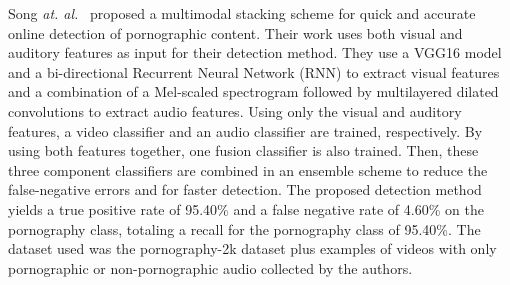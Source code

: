 Song \textit{at. al.}~\cite{song2020enhanced} proposed a multimodal stacking scheme for quick and accurate online detection of pornographic content.
Their work uses both visual and auditory features as input for their detection method. 
They use a VGG16 model and a bi-directional Recurrent Neural Network (RNN) to extract visual features and a combination of a Mel-scaled spectrogram followed by multilayered dilated convolutions to extract audio features. 
Using only the visual and auditory features, a video classifier and an audio classifier are trained, respectively. 
By using both features together, one fusion classifier is also trained.
Then, these three component classifiers are combined in an ensemble scheme to reduce the false-negative errors and for faster detection. 
The proposed detection method yields a true positive rate of 95.40\% and a false negative rate of 4.60\% on the pornography class, totaling a recall for the pornography class of 95.40\%. 
The dataset used was the pornography-2k\cite{2kdataset} dataset plus examples of videos with only pornographic or non-pornographic audio collected by the authors. 


